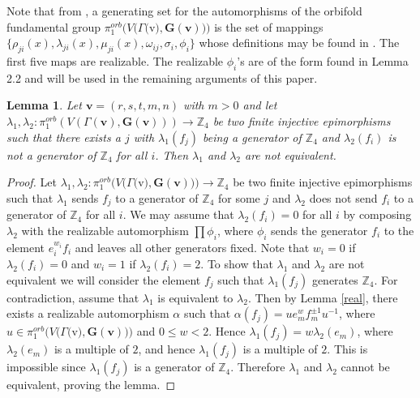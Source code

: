 \documentclass{amsart}
\newtheorem{lemma}[theorem]{Lemma}
\theoremstyle{definition}
\numberwithin{equation}{section}
\begin{document}
Note that from \cite{FR}, a generating set for the automorphisms of the orbifold fundamental group $\pi_1^{orb}(V(\Gamma($v$),\mathbf{G(v)}))$ is the set of mappings $\{\rho_{ji}(x), \lambda_{ji}(x), \mu_{ji}(x), \omega_{ij}, \sigma_i, \phi_i\}$ whose definitions may be found in \cite{FR}. The first five maps are realizable. The realizable $\phi_i$'s are of the form found in Lemma 2.2 and will be used in the remaining arguments of this paper.


\begin{lemma}
Let ${\mathbf{v}}=(r,s,t,m,n)$ with $m>0$ and let \\$\lambda_1,\lambda_2:\pi_1^{orb}(V(\Gamma({\mathbf{v}}),{\mathbf{G(v)}}))\longrightarrow\mathbb{Z}_{4}$ be two finite injective epimorphisms such that there exists a $j$ with $\lambda_1(f_j)$ being a generator of $\mathbb{Z}_{4}$ and $\lambda_2(f_i)$ is not a generator of $\mathbb{Z}_{4}$ for all $i$. Then $\lambda_1$ and $\lambda_2$ are not equivalent.
\end{lemma}

\begin{proof}
Let $\lambda_1,\lambda_2:\pi_1^{orb}(V(\Gamma($v$),{\mathbf{G(v)}}))\longrightarrow\mathbb{Z}_{4}$ be two finite injective epimorphisms such that $\lambda_1$ sends $f_j$ to a generator of $\mathbb{Z}_{4}$ for some $j$ and $\lambda_2$ does not send $f_i$ to a generator of $\mathbb{Z}_{4}$ for all $i$. We may assume that ${\lambda_2}(f_i)=0$ for all $i$ by composing $\lambda_2$ with the realizable automorphism $\prod\phi_i$, where $\phi_i$ sends the generator $f_i$ to the element $e_i^{w_i}f_i$ and leaves all other generators fixed. Note that $w_i=0$ if $\lambda_2(f_i)=0$ and $w_i=1$ if $\lambda_2(f_i)=2$. To show that $\lambda_1$ and ${\lambda_2}$ are not equivalent we will consider the element $f_j$ such that $\lambda_1(f_j)$ generates $\mathbb{Z}_{4}$. For contradiction, assume that $\lambda_1$ is equivalent to ${\lambda_2}$. Then by Lemma \ref{real}, there exists a realizable automorphism $\alpha$ such that $\alpha(f_j)=ue_m^wf_m^{\pm1}u^{-1}$, where $u\in{\pi_1^{orb}(V(\Gamma(}$v${),{\mathbf{G(v)}}))}$ and $0\leq{w}<{2}$. Hence $\lambda_1(f_j)=w{\lambda_2}(e_m)$, where ${\lambda_2}(e_m)$ is a multiple of $2$, and hence $\lambda_1(f_j)$ is a multiple of $2$. This is impossible since $\lambda_1(f_j)$ is a generator of $\mathbb{Z}_{4}$. Therefore $\lambda_1$ and $\lambda_2$ cannot be equivalent, proving the lemma.
\end{proof}
\end{document}
